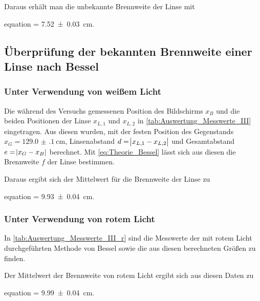 	
	Daraus erhält man die unbekannte Brennweite der Linse mit 
	 \begin{empheq}{equation}
			\label{val:Auswertung_Unbekannt}
			 = \SI{7.52(3)}{\centi\meter}.
	 \end{empheq}
	

\subsection{Überprüfung der bekannten Brennweite einer Linse nach Bessel}

	\subsubsection{Unter Verwendung von weißem Licht}
	
		Die während des Versuchs gemessenen Position des Bildschirms $x_{B}$ und
		die beiden Positionen der Linse $x_{L,1}$ und $x_{L,2}$ in \cref{tab:Auswertung_Messwerte_III} eingetragen. 
		Aus diesen wurden, mit der festen Position des Gegenstands $x_{G} = \SI{129.0(1)}{\centi\meter}$,
		Linsenabstand $d = \envert{x_{L,1} - x_{L,2}}$ und Gesamtabstand $e = \envert{x_{G}- x_{B}}$ 
		berechnet. Mit \cref{eq:Theorie_Bessel} lässt sich aus diesen die Brennweite $f$ der Linse bestimmen.
		
		
		
		Daraus ergibt sich der Mittelwert für die Brennweite der Linse zu
		\begin{empheq}{equation}
			\label{val:Auswertung_BesselWeis}
			 = \SI{9.93(4)}{\centi\meter}.
		\end{empheq}
		
	\subsubsection{Unter Verwendung von rotem Licht}	
		
		In \cref{tab:Auswertung_Messwerte_III_r} sind die Messwerte der mit rotem
		Licht durchgeführten Methode von Bessel sowie die aus diesen berechneten
		Größen zu finden.
		
		
		
		 Der Mittelwert der Brennweite von rotem Licht ergibt sich aus diesen Daten zu
		\begin{empheq}{equation}
			\label{val:Auswertung_BesselRot}
			 = \SI{9.99(4)}{\centi\meter}.
		\end{empheq}		 
		
